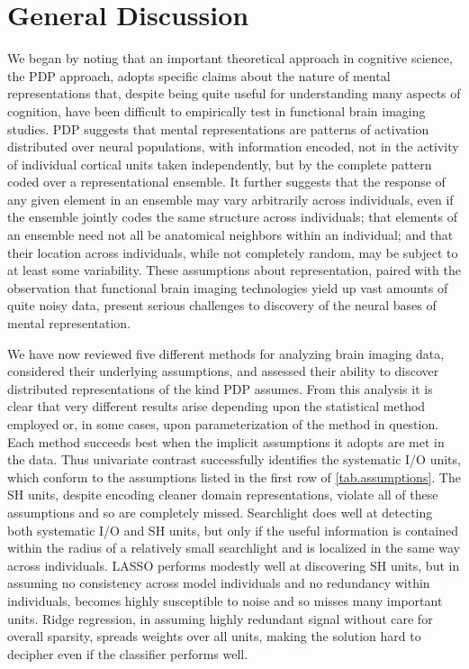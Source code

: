 \section{General Discussion}

We began by noting that an important theoretical approach in cognitive science, the PDP approach, adopts specific claims about the nature of mental representations that, despite being quite useful for understanding many aspects of cognition, have been difficult to empirically test in functional brain imaging studies. PDP suggests that mental representations are patterns of activation distributed over neural populations, with information encoded, not in the activity of individual cortical units taken independently, but by the complete pattern coded over a representational ensemble. It further suggests that the response of any given element in an ensemble may vary arbitrarily across individuals, even if the ensemble jointly codes the same structure across individuals; that elements of an ensemble need not all be anatomical neighbors within an individual; and that their location across individuals, while not completely random, may be subject to at least some variability. These assumptions about representation, paired with the observation that functional brain imaging technologies yield up vast amounts of quite noisy data, present serious challenges to  discovery of the neural bases of mental representation.

We have now reviewed five different methods for analyzing brain imaging data, considered their underlying assumptions, and assessed their ability to discover distributed representations of the kind PDP assumes. From this analysis it is clear that very different results arise depending upon the statistical method employed or, in some cases, upon parameterization of the method in question. Each method succeeds best when the implicit assumptions it adopts are met in the data. Thus univariate contrast successfully identifies the systematic I/O units, which conform to the assumptions listed in the first row of \ref{tab.assumptions}. The SH units, despite encoding cleaner domain representations, violate all of these assumptions and so are completely missed. Searchlight does well at detecting both systematic I/O and SH units, but only if the useful information is contained within the radius of a relatively small searchlight and is localized in the same way across individuals. LASSO performs modestly well at discovering SH units, but in assuming no consistency across model individuals and no redundancy within individuals, becomes highly susceptible to noise and so misses many important units. Ridge regression, in assuming highly redundant signal without care for overall sparsity, spreads weights over all units, making the solution hard to decipher even if the classifier performs well.

